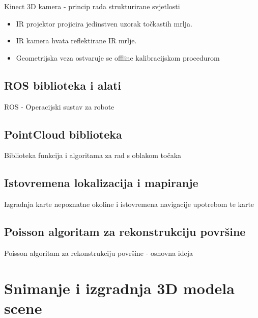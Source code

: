 \documentclass{beamer}
\begin{document}
\begin{frame}{Kinect 3D kamera - princip rada strukturirane svjetlosti}
    \begin{itemize}
        \item <1-> IR projektor projicira \alert{jedinstven} uzorak točkastih mrlja.
        \item <2-> IR kamera hvata reflektirane IR mrlje.
        \item <3-> Geometrijska veza ostvaruje se offline kalibracijskom
            procedurom
    \end{itemize}
    
\end{frame}

\subsection{ROS biblioteka i alati}
\begin{frame}{ROS - Operacijski sustav za robote}
    
\end{frame}

\subsection{PointCloud biblioteka}
\begin{frame}{Biblioteka funkcija i algoritama za rad s oblakom
    točaka}
    
\end{frame}

\subsection{Istovremena lokalizacija i mapiranje}
\begin{frame}{Izgradnja karte nepoznatne okoline i istovremena
    navigacije upotrebom te karte}
    
\end{frame}

\subsection{Poisson algoritam za rekonstrukciju površine}
\begin{frame}{Poisson algoritam za rekonstrukciju površine - osnovna
    ideja}
    
\end{frame}

\section{Snimanje i izgradnja 3D modela scene} 
\end{document}
